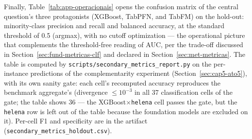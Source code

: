 Finally, Table~\ref{tab:app-operacionais} opens the confusion matrix
of the central question's three protagonists (XGBoost, TabPFN, and
TabFM) on the hold-out: minority-class precision and recall and
balanced accuracy, at the standard threshold of 0.5 (argmax), with no
cutoff optimization --- the operational picture that complements the
threshold-free reading of AUC, per the trade-off discussed in
Section~\ref{sec:fund-metricas-clf} and declared in
Section~\ref{sec:met-metricas}. The table is computed by
\texttt{scripts/\allowbreak secondary\_\allowbreak metrics\_\allowbreak report.py}
on the per-instance predictions of the complementarity experiment
(Section~\ref{sec:cap5-ato5}), with its own sanity gate: each cell's
recomputed accuracy reproduces the benchmark aggregate's (divergence
$\leq 10^{-3}$ in all 37 classification cells of the gate; the
table shows 36 --- the XGBoost$\times$\texttt{helena} cell passes
the gate, but the \texttt{helena} row is left out of the table
because the foundation models are excluded on it). Per-cell F1 and
specificity are in
the artifact
(\texttt{secondary\_\allowbreak metrics\_\allowbreak holdout.csv}).



